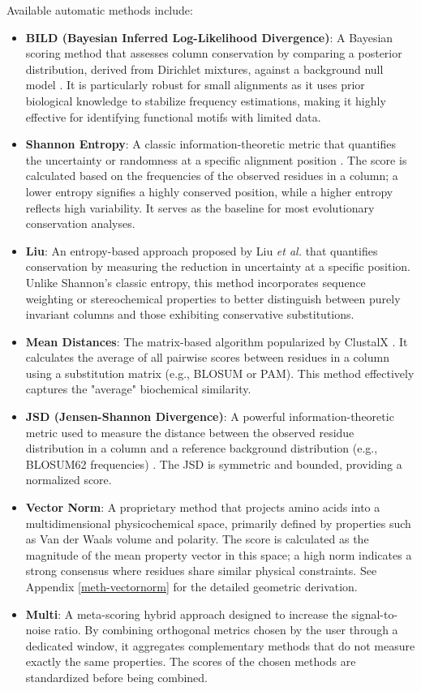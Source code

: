 \documentclass[a4paper]{article}
\begin{document}
Available automatic methods include:
\begin{itemize}
\item \textbf{BILD (Bayesian Inferred Log-Likelihood Divergence)}: A Bayesian scoring method that assesses column conservation by comparing a posterior distribution, derived from Dirichlet mixtures, against a background null model \cite{bild}. It is particularly robust for small alignments as it uses prior biological knowledge to stabilize frequency estimations, making it highly effective for identifying functional motifs with limited data.
\item \textbf{Shannon Entropy}: A classic information-theoretic metric that quantifies the uncertainty or randomness at a specific alignment position \cite{meth:shannona,meth:shannonb}. The score is calculated based on the frequencies of the observed residues in a column; a lower entropy signifies a highly conserved position, while a higher entropy reflects high variability. It serves as the baseline for most evolutionary conservation analyses.
\item \textbf{Liu}: An entropy-based approach proposed by Liu \emph{et al.} \cite{liu2} that quantifies conservation by measuring the reduction in uncertainty at a specific position. Unlike Shannon's classic entropy, this method incorporates sequence weighting or stereochemical properties to better distinguish between purely invariant columns and those exhibiting conservative substitutions.
\item \textbf{Mean Distances}: The matrix-based algorithm popularized by ClustalX \cite{soft:clustalx}. It calculates the average of all pairwise scores between residues in a column using a substitution matrix (e.g., BLOSUM or PAM). This method effectively captures the "average" biochemical similarity.
\item \textbf{JSD (Jensen-Shannon Divergence)}: A powerful information-theoretic metric used to measure the distance between the observed residue distribution in a column and a reference background distribution (e.g., BLOSUM62 frequencies) \cite{method:jsd}. The JSD is symmetric and bounded, providing a normalized score.
\item \textbf{Vector Norm}: A proprietary method that projects amino acids into a multidimensional physicochemical space, primarily defined by properties such as Van der Waals volume and polarity. The score is calculated as the magnitude of the mean property vector in this space; a high norm indicates a strong consensus where residues share similar physical constraints. See Appendix \ref{meth-vectornorm} for the detailed geometric derivation.
\item \textbf{Multi}: A meta-scoring hybrid approach designed to increase the signal-to-noise ratio. By combining orthogonal metrics chosen by the user through a dedicated window, it aggregates complementary methods that do not measure exactly the same properties. The scores of the chosen methods are standardized before being combined.
\end{itemize}
\end{document}
